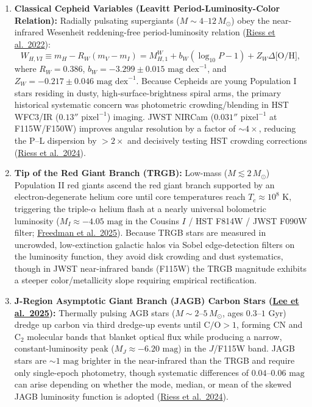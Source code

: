 \documentclass[aps,prd,preprint,superscriptaddress,nofootinbib]{revtex4-2}
\begin{document}
\begin{enumerate}
    \setlength{\itemsep}{3pt}
    \item \textbf{Classical Cepheid Variables (Leavitt Period-Luminosity-Color Relation):} Radially pulsating supergiants ($M \sim 4\text{--}12\,M_\odot$) obey the near-infrared Wesenheit reddening-free period-luminosity relation (\href{https://arxiv.org/pdf/2112.04510}{Riess et al.\ 2022}):
    \begin{equation}
        W_{H,VI} \equiv m_H - R_W (m_V - m_I) = M_{H,1}^W + b_W (\log_{10} P - 1) + Z_W \Delta\text{[O/H]},
        \label{m:eq:wesenheit}
    \end{equation}
    where $R_W = 0.386$, $b_W = -3.299 \pm 0.015\text{ mag dex}^{-1}$, and $Z_W = -0.217 \pm 0.046\text{ mag dex}^{-1}$. Because Cepheids are young Population I stars residing in dusty, high-surface-brightness spiral arms, the primary historical systematic concern was photometric crowding/blending in HST WFC3/IR ($0.13''\text{ pixel}^{-1}$) imaging. JWST NIRCam ($0.031''\text{ pixel}^{-1}$ at F115W/F150W) improves angular resolution by a factor of $\sim 4\times$, reducing the P--L dispersion by $>2\times$ and decisively testing HST crowding corrections (\href{https://arxiv.org/abs/2408.11770}{Riess et al.\ 2024}).
    \item \textbf{Tip of the Red Giant Branch (TRGB):} Low-mass ($M \lesssim 2\,M_\odot$) Population II red giants ascend the red giant branch supported by an electron-degenerate helium core until core temperatures reach $T_c \approx 10^8\text{ K}$, triggering the triple-$\alpha$ helium flash at a nearly universal bolometric luminosity ($M_I \approx -4.05\text{ mag}$ in the Cousins $I$ / HST F814W / JWST F090W filter; \href{https://arxiv.org/abs/2408.06153}{Freedman et al.\ 2025}). Because TRGB stars are measured in uncrowded, low-extinction galactic halos via Sobel edge-detection filters on the luminosity function, they avoid disk crowding and dust systematics, though in JWST near-infrared bands (F115W) the TRGB magnitude exhibits a steeper color/metallicity slope requiring empirical rectification.
    \item \textbf{J-Region Asymptotic Giant Branch (JAGB) Carbon Stars (\href{https://arxiv.org/abs/2408.03474}{Lee et al.\ 2025}):} Thermally pulsing AGB stars ($M \sim 2\text{--}5\,M_\odot$, ages $0.3\text{--}1\text{ Gyr}$) dredge up carbon via third dredge-up events until $\text{C/O} > 1$, forming $\text{CN}$ and $\text{C}_2$ molecular bands that blanket optical flux while producing a narrow, constant-luminosity peak ($M_J \approx -6.20\text{ mag}$) in the $J$/F115W band. JAGB stars are $\sim 1\text{ mag}$ brighter in the near-infrared than the TRGB and require only single-epoch photometry, though systematic differences of $0.04\text{--}0.06\text{ mag}$ can arise depending on whether the mode, median, or mean of the skewed JAGB luminosity function is adopted (\href{https://arxiv.org/abs/2408.11770}{Riess et al.\ 2024}).
\end{enumerate}
\end{document}

